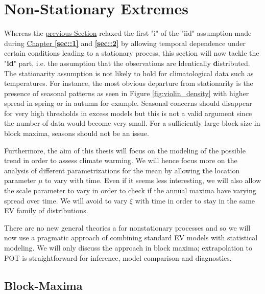 \section{Non-Stationary Extremes}\label{nstatio}

Whereas the \hyperref[sec:statio]{previous Section} relaxed the first "i" of the "iid" assumption made during  \hyperref[sec::1]{Chapter \textbf{\ref{sec::1}}} and \textbf{\ref{sec::2}} by allowing temporal dependence under certain conditions leading to a stationary process, this section will now tackle the "\textbf{id}" part, i.e. the assumption that the observations are \textbf{i}dentically \textbf{d}istributed. 
The stationarity assumption is not likely to hold for climatological data such as temperatures. For instance, the most obvious departure from stationarity is the presence of seasonal patterns as seen in Figure \ref{fig:violin_density} with higher spread in spring or in autumn for example. Seasonal concerns should disappear for very high thresholds in excess models but this is not a valid argument since the number of data would become very small. For a sufficiently large block size in block maxima, seasons should not be an issue. 

Furthermore, the aim of this thesis will focus on the modeling of the possible trend in order to assess climate warming. 
We will hence focus more on the analysis of different parametrizations for the mean by allowing the location parameter $\mu$ to vary with time. Even if it seems less interesting, we will also allow the scale parameter to vary in order to check if the annual maxima have varying spread over time. We will avoid to vary $\xi$ with time in order to stay in the same EV family of distributions.

There are no new general theories a for nonstationary processes and so we will now use a pragmatic approach of combining standard EV models with statistical modeling.
We will only discuss the approach in block maxima; extrapolation to POT is straightforward for inference, model comparison and diagnostics.


\subsection{Block-Maxima}\label{sec:gev_nonstatio}

